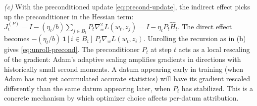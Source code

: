 \begin{solution}
\textit{(c)} With the preconditioned update \eqref{eq:precond-update}, the indirect effect picks up the preconditioner in the Hessian term: $J_t^{(P)} = I - (\eta_t/b)\sum_{j\in B_t}P_t\nabla_w^2 L(w_t,z_j) = I - \eta_t P_t \widehat{H}_t$. The direct effect becomes $-(\eta_t/b)\,\mathbf{1}[i\in B_t]\,P_t\nabla_w L(w_t,z_i)$. Unrolling the recursion as in (b) gives \eqref{eq:unroll-precond}. The preconditioner $P_t$ at step $t$ acts as a local rescaling of the gradient: Adam's adaptive scaling amplifies gradients in directions with historically small second moments. A datum appearing early in training (when Adam has not yet accumulated accurate statistics) will have its gradient rescaled differently than the same datum appearing later, when $P_t$ has stabilized. This is a concrete mechanism by which optimizer choice affects per-datum attribution.

\end{solution}

